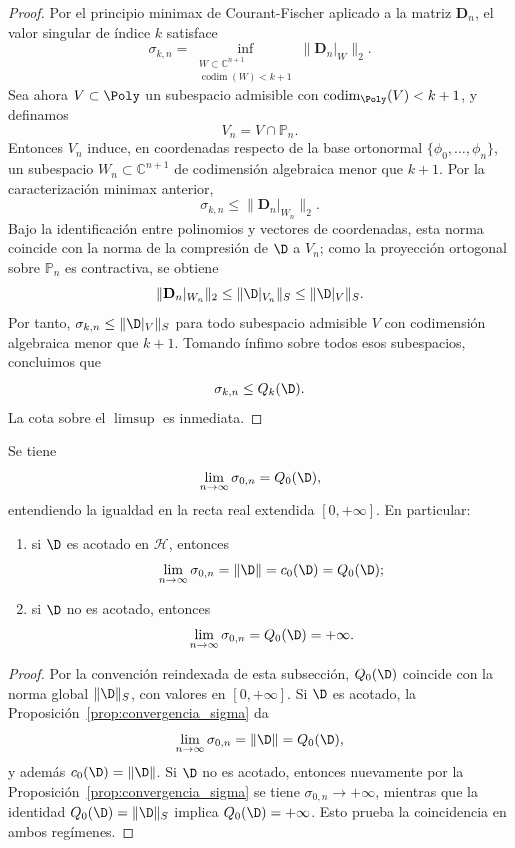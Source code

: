 \begin{proof}
	Por el principio minimax de Courant-Fischer aplicado a la matriz $\mathbf{D}_n$, el valor singular de índice $k$ satisface
	\[
		\sigma_{k,n} = \inf_{\substack{W \subset \mathbb{C}^{n+1} \\ \operatorname{codim}(W) < k+1}} \|\mathbf{D}_n|_W\|_2.
	\]
	Sea ahora $V \subset \Poly$ un subespacio admisible con $\operatorname{codim}_{\Poly}(V) < k+1$, y definamos
	\[
		V_n = V \cap \mathbb{P}_{n}.
	\]
	Entonces $V_n$ induce, en coordenadas respecto de la base ortonormal $\{\phi_0,\dots,\phi_{n}\}$, un subespacio $W_n \subset \mathbb{C}^{n+1}$ de codimensión algebraica menor que $k+1$. Por la caracterización minimax anterior,
	\[
		\sigma_{k,n} \le \|\mathbf{D}_n|_{W_n}\|_2.
	\]
	Bajo la identificación entre polinomios y vectores de coordenadas, esta norma coincide con la norma de la compresión de $\D$ a $V_n$; como la proyección ortogonal sobre $\mathbb{P}_{n}$ es contractiva, se obtiene
	\[
		\|\mathbf{D}_n|_{W_n}\|_2 \le \|\D|_{V_n}\|_S \le \|\D|_V\|_S.
	\]
	Por tanto, $\sigma_{k,n} \le \|\D|_V\|_S$ para todo subespacio admisible $V$ con codimensión algebraica menor que $k+1$. Tomando ínfimo sobre todos esos subespacios, concluimos que
	\[
		\sigma_{k,n} \le Q_k(\D).
	\]
	La cota sobre el $\limsup$ es inmediata.
\end{proof}

\begin{thm}\label{thm:sigma1_q1_extendido}
	Se tiene
	\[
		\lim_{n \to \infty} \sigma_{0,n} = Q_0(\D),
	\]
	entendiendo la igualdad en la recta real extendida $[0,+\infty]$. En particular:
	\begin{enumerate}
		\item si $\D$ es acotado en $\mathcal{H}$, entonces
		      \[
			      \lim_{n \to \infty} \sigma_{0,n} = \|\D\| = c_0(\D) = Q_0(\D);
		      \]
		\item si $\D$ no es acotado, entonces
		      \[
			      \lim_{n \to \infty} \sigma_{0,n} = Q_0(\D) = +\infty.
		      \]
	\end{enumerate}
\end{thm}

\begin{proof}
	Por la convención reindexada de esta subsección, $Q_0(\D)$ coincide con la norma global $\|\D\|_S$, con valores en $[0,+\infty]$. Si $\D$ es acotado, la Proposición~\ref{prop:convergencia_sigma} da
	\[
		\lim_{n \to \infty} \sigma_{0,n} = \|\D\| = Q_0(\D),
	\]
	y además $c_0(\D) = \|\D\|$. Si $\D$ no es acotado, entonces nuevamente por la Proposición~\ref{prop:convergencia_sigma} se tiene $\sigma_{0,n} \to +\infty$, mientras que la identidad $Q_0(\D) = \|\D\|_S$ implica $Q_0(\D) = +\infty$. Esto prueba la coincidencia en ambos regímenes.
\end{proof}

